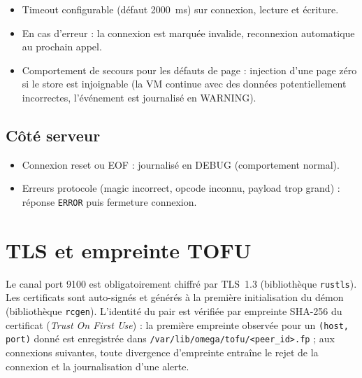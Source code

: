\begin{itemize}[leftmargin=*]
    \item Timeout configurable (défaut 2000~ms) sur connexion, lecture et écriture.
    \item En cas d'erreur : la connexion est marquée invalide, reconnexion automatique au prochain appel.
    \item Comportement de secours pour les défauts de page : injection d'une page zéro si le store est injoignable (la VM continue avec des données potentiellement incorrectes, l'événement est journalisé en WARNING).
\end{itemize}

\subsection{Côté serveur}

\begin{itemize}[leftmargin=*]
    \item Connexion reset ou EOF : journalisé en DEBUG (comportement normal).
    \item Erreurs protocole (magic incorrect, opcode inconnu, payload trop grand) : réponse \texttt{ERROR} puis fermeture connexion.
\end{itemize}

\section{TLS et empreinte TOFU}

Le canal port 9100 est obligatoirement chiffré par TLS~1.3 (bibliothèque \texttt{rustls}). Les certificats sont auto-signés et générés à la première initialisation du démon (bibliothèque \texttt{rcgen}). L'identité du pair est vérifiée par empreinte SHA-256 du certificat (\emph{Trust On First Use}) : la première empreinte observée pour un \texttt{(host, port)} donné est enregistrée dans \texttt{/var/lib/omega/tofu/<peer\_id>.fp} ; aux connexions suivantes, toute divergence d'empreinte entraîne le rejet de la connexion et la journalisation d'une alerte.
